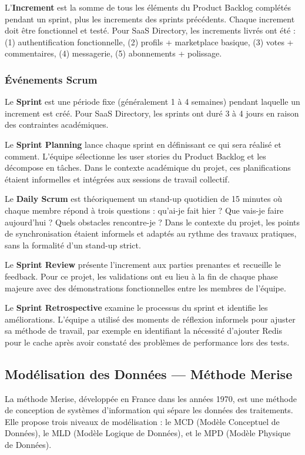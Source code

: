 L'\textbf{Increment} est la somme de tous les éléments du Product Backlog complétés pendant un sprint, plus les increments des sprints précédents. Chaque increment doit être fonctionnel et testé. Pour SaaS Directory, les increments livrés ont été : (1) authentification fonctionnelle, (2) profils + marketplace basique, (3) votes + commentaires, (4) messagerie, (5) abonnements + polissage.

\subsubsection{Événements Scrum}

Le \textbf{Sprint} est une période fixe (généralement 1 à 4 semaines) pendant laquelle un increment est créé. Pour SaaS Directory, les sprints ont duré 3 à 4 jours en raison des contraintes académiques.

Le \textbf{Sprint Planning} lance chaque sprint en définissant ce qui sera réalisé et comment. L'équipe sélectionne les user stories du Product Backlog et les décompose en tâches. Dans le contexte académique du projet, ces planifications étaient informelles et intégrées aux sessions de travail collectif.

Le \textbf{Daily Scrum} est théoriquement un stand-up quotidien de 15 minutes où chaque membre répond à trois questions : qu'ai-je fait hier ? Que vais-je faire aujourd'hui ? Quels obstacles rencontre-je ? Dans le contexte du projet, les points de synchronisation étaient informels et adaptés au rythme des travaux pratiques, sans la formalité d'un stand-up strict.

Le \textbf{Sprint Review} présente l'increment aux parties prenantes et recueille le feedback. Pour ce projet, les validations ont eu lieu à la fin de chaque phase majeure avec des démonstrations fonctionnelles entre les membres de l'équipe.

Le \textbf{Sprint Retrospective} examine le processus du sprint et identifie les améliorations. L'équipe a utilisé des moments de réflexion informels pour ajuster sa méthode de travail, par exemple en identifiant la nécessité d'ajouter Redis pour le cache après avoir constaté des problèmes de performance lors des tests.

\subsection{Modélisation des Données --- Méthode Merise}

La méthode Merise, développée en France dans les années 1970, est une méthode de conception de systèmes d'information qui sépare les données des traitements. Elle propose trois niveaux de modélisation : le MCD (Modèle Conceptuel de Données), le MLD (Modèle Logique de Données), et le MPD (Modèle Physique de Données).

